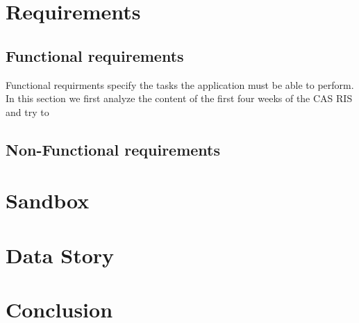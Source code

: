 \documentclass[12pt, letterpaper, twoside]{article}
\begin{document}
\section{Requirements}

\subsection{Functional requirements}
Functional requirments specify the tasks the application must be able to perform. In this section we first analyze the
content of the first four weeks of the CAS RIS and try to

\subsection{Non-Functional requirements}


\section{Sandbox}

\section{Data Story}

\section{Conclusion}
\end{document}
